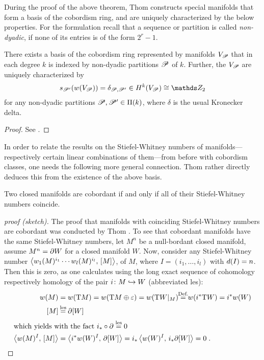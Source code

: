 During the proof of the above theorem, Thom constructs special
manifolds that form a basis of the cobordism ring,
and are uniquely characterized by the below properties.
For the formulation recall that a sequence or partition is called
\emph{non-dyadic}, if none of its entries is of the form $2^r-1$.
\begin{Thm}\label{thm:basiscobordismring}
  There exists a basis of the cobordism ring represented by manifolds
  $V_{\mathscr{P}}$ that in each degree $k$ is indexed by non-dyadic
  partitions $\mathscr{P}$ of $k$. Further, the $V_{\mathscr{P}}$ are uniquely
  characterized by
  \begin{gather*}
    \s{\Part'}(\W{V_\Part}) = \delta_{\Part,\Part'}
    \in \H^k(V_{\Part})\cong \Zmod2
  \end{gather*}
  for any non-dyadic partitions $\mathscr{P},\mathscr{P}'\in\Pi({k})$,
  where $\delta$ is the usual Kronecker delta.
  \begin{proof}
    See \cite[Section~IV.5, proof of Theorem~IV.9]{thom}.
  \end{proof}
\end{Thm}

In order to relate the results on the Stiefel-Whitney numbers of
manifolds---respectively certain linear combinations of them---from
before with cobordism classes, one needs the following more general
connection. Thom rather directly deduces this from the existence of
the above basis.
\begin{Thm}[Thom]\label{thm:cobordantiffswnumscoincide}
  Two closed manifolds are cobordant if and only if all of their
  Stiefel-Whitney numbers coincide.
  \begin{proof}[proof (sketch)]
    The proof that manifolds with coinciding Stiefel-Whitney numbers
    are cobordant was conducted by Thom \cite[Theorem IV.10]{thom}.
    To see that cobordant manifolds have the same Stiefel-Whitney
    numbers, let $M^n$ be a null-bordant closed manifold, \idest
    assume $M^n=\partial{W}$ for a closed manifold $W$. Now, consider
    any Stiefel-Whitney number 
    $\left\langle {w_{1}}(M)^{i_1}\dotsm{w_{l}}(M)^{i_l},\, [M] \right\rangle$,
    of $M$, where $I=(i_1,\dotsc,i_l)$ with $d(I)=n$.
    Then this is zero, as one calculates using the long
    exact sequence of cohomology respectively homology of the pair
    $i\colon M\hookrightarrow W$ (abbreviated les):
    \begin{align*}
      \W{M}
      &= \W{\T M}
        = \W{\T M\oplus\trivbdl}
        = \W{\T W|_{M}}
        \cequalsby{Def.} \W{\pb i \T W} = \pb i \W{W} \\
      \fundcl M
      &\cequalsby{les} \partial \fundcl{W} \\
      \intertext{which yields with the fact
      $\pf i\circ\partial\overset{\text{les}}= 0$}
      \capped{\W{M}^I}{\fundcl M}
      &= \capped{\pb i\W{W}^I}{\partial\fundcl{W}}
        = \pf i\capped{\W{W}^I}{\pf i\partial \fundcl{W}}
        = 0
        \;.
        \qedhere
    \end{align*}
  \end{proof}
\end{Thm}

